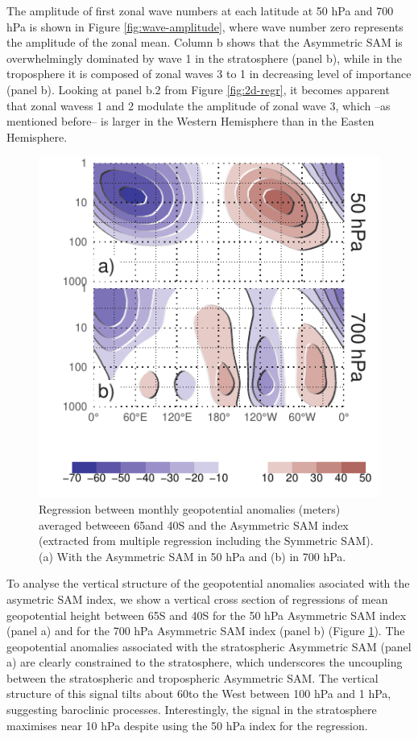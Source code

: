 \documentclass[]{ametsocV5}
\begin{document}
The amplitude of first zonal wave numbers at each latitude at 50 hPa and
700 hPa is shown in Figure \ref{fig:wave-amplitude}, where wave number
zero represents the amplitude of the zonal mean. Column b shows that the
Asymmetric SAM is overwhelmingly dominated by wave 1 in the stratosphere
(panel b), while in the troposphere it is composed of zonal waves 3 to 1
in decreasing level of importance (panel b). Looking at panel b.2 from
Figure \ref{fig:2d-regr}, it becomes apparent that zonal wavess 1 and 2
modulate the amplitude of zonal wave 3, which --as mentioned before-- is
larger in the Western Hemisphere than in the Easten Hemisphere.

\begin{figure}
\includegraphics{vertical-regression-1} \caption[Regression between monthly geopotential anomalies (meters) averaged betweeen 65\degree and 40\degree S and the Asymmetric SAM index (extracted from multiple regression including the Symmetric SAM)]{Regression between monthly geopotential anomalies (meters) averaged betweeen 65\degree and 40\degree S and the Asymmetric SAM index (extracted from multiple regression including the Symmetric SAM). (a) With the Asymmetric SAM in 50 hPa and (b) in 700 hPa.}\label{fig:vertical-regression}
\end{figure}

To analyse the vertical structure of the geopotential anomalies
asociated with the asymetric SAM index, we show a vertical cross section
of regressions of mean geopotential height between 65\degree S and
40\degree S for the 50 hPa Asymmetric SAM index (panel a) and for the
700 hPa Asymmetric SAM index (panel b) (Figure
\ref{fig:vertical-regression}). The geopotential anomalies associated
with the stratospheric Asymmetric SAM (panel a) are clearly constrained
to the stratosphere, which underscores the uncoupling between the
stratospheric and tropospheric Asymmetric SAM. The vertical structure of
this signal tilts about 60\degree to the West between 100 hPa and 1 hPa,
suggesting baroclinic processes. Interestingly, the signal in the
stratosphere maximises near 10 hPa despite using the 50 hPa index for
the regression.
\end{document}
